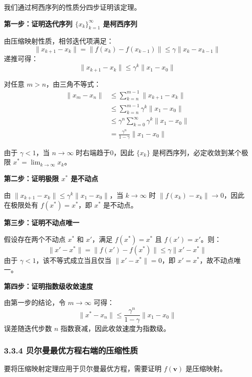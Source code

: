 \documentclass[UTF8]{article}
\begin{document}
\begin{proofbox}
    我们通过柯西序列的性质分四步证明该定理。

    \textbf{第一步：证明迭代序列 $\{x_k\}_{k=1}^\infty$ 是柯西序列}

    由压缩映射性质，相邻迭代项满足：
    \[
    \| x_{k+1} - x_k \| = \| f(x_k) - f(x_{k-1}) \| \leq \gamma \| x_k - x_{k-1} \|
    \]
    递推可得：
    \[
    \| x_{k+1} - x_k \| \leq \gamma^k \| x_1 - x_0 \|
    \]

    对任意 $m > n$，由三角不等式：
    \[
    \begin{aligned}
    \| x_m - x_n \| &\leq \sum_{k=n}^{m-1} \| x_{k+1} - x_k \| \\
    &\leq \sum_{k=n}^{m-1} \gamma^k \| x_1 - x_0 \| \\
    &\leq \gamma^n \sum_{k=0}^{\infty} \gamma^k \| x_1 - x_0 \| \\
    &= \frac{\gamma^n}{1-\gamma} \| x_1 - x_0 \|
    \end{aligned}
    \]

    由于 $\gamma < 1$，当 $n \to \infty$ 时右端趋于0，因此 $\{x_k\}$ 是柯西序列，必定收敛到某个极限 $x^* = \lim_{k \to \infty} x_k$。

    \textbf{第二步：证明极限 $x^*$ 是不动点}

    由 $\| x_{k+1} - x_k \| \leq \gamma^k \| x_1 - x_0 \|$，当 $k \to \infty$ 时 $\| f(x_k) - x_k \| \to 0$，因此在极限处有 $f(x^*) = x^*$，即 $x^*$ 是不动点。

    \textbf{第三步：证明不动点唯一}

    假设存在两个不动点 $x^*$ 和 $x'$，满足 $f(x^*)=x^*$ 且 $f(x')=x'$。则：
    \[
    \| x' - x^* \| = \| f(x') - f(x^*) \| \leq \gamma \| x' - x^* \|
    \]
    由于 $\gamma < 1$，该不等式成立当且仅当 $\| x' - x^* \| = 0$，即 $x' = x^*$，故不动点唯一。

    \textbf{第四步：证明指数级收敛速度}

    由第一步的结论，令 $m \to \infty$ 可得：
    \[
    \| x^* - x_n \| \leq \frac{\gamma^n}{1-\gamma} \| x_1 - x_0 \|
    \]
    误差随迭代步数 $n$ 指数衰减，因此收敛速度为指数级。
\end{proofbox}

\subsubsection*{3.3.4 贝尔曼最优方程右端的压缩性质}

要将压缩映射定理应用于贝尔曼最优方程，需要证明 $f(\boldsymbol{v})$ 是压缩映射。
\end{document}

